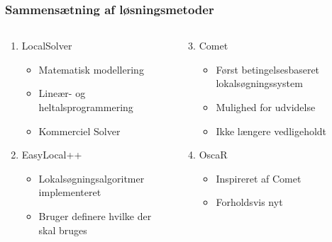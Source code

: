 \documentclass[smaller]{beamer}
\begin{document}
\begin{frame}
 \frametitle{Sammensætning af løsningsmetoder}
 \begin{columns}[T]
    \begin{column}[T]{.5\textwidth}
     \begin{enumerate}[<+->]
  \item LocalSolver \footnotemark
  \begin{itemize}[<+->]
   \item Matematisk modellering
   \item Lineær- og heltalsprogrammering
   \item Kommerciel Solver
  \end{itemize}
  \item EasyLocal++ \footnotemark
  \begin{itemize}[<+->]
   \item Lokalsøgningsalgoritmer implementeret
   \item Bruger definere hvilke der skal bruges 
  \end{itemize}
\end{enumerate}

\end{column} 
\begin{column}[T]{.5\textwidth}
     \begin{enumerate}[<+->]
     \setcounter{enumi}{2}
  \item Comet \footnotemark
  \begin{itemize}[<+->]
   \item Først betingelsesbaseret lokalsøgningssystem
   \item Mulighed for udvidelse
   \item Ikke længere vedligeholdt
  \end{itemize}
\item OscaR \footnotemark
  \begin{itemize}[<+->]
   \item Inspireret af Comet
   \item Forholdsvis nyt
  \end{itemize}
   \end{enumerate}

  
\end{column}
\end{columns}


  

\end{frame}
\end{document}
